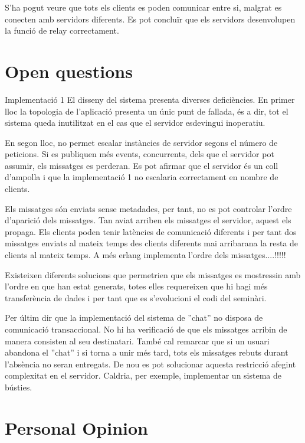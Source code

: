 \documentclass[a4paper, 11pt]{article}
\begin{document}
S'ha pogut veure que tots els clients es poden comunicar entre si, malgrat es conecten amb servidors diferents.
Es pot concluïr que els servidors desenvolupen la funció de relay correctament. 

\section{Open questions}


Implementació 1
El disseny del sistema presenta diverses deficiències. En primer lloc la topologia de l'aplicació presenta un únic punt de fallada, és a dir, tot el sistema queda inutilitzat en el cas que el servidor esdevingui inoperatiu. 

En segon lloc, no permet escalar instàncies de servidor segons el número de peticions. Si es publiquen més events, concurrents, dels que el servidor pot assumir, els missatges es perderan.
Es pot afirmar que el servidor és un coll d'ampolla i que la implementació 1 no escalaria correctament en nombre de clients. 

Els missatges són enviats sense metadades, per tant, no es pot controlar l'ordre d'aparició dels missatges. Tan aviat arriben els missatges el servidor, aquest els propaga. Els clients poden tenir latències de comunicació diferents i per tant dos missatges enviats al mateix temps des clients diferents mai arribarana la resta de clients al mateix temps. A més erlang implementa l'ordre dels missatges....!!!!!

Existeixen diferents solucions que permetrien que els missatges es mostressin amb l'ordre en que han estat generats, totes elles requereixen que hi hagi més transferència de dades i per tant que es s'evolucioni el codi del seminàri. 

Per últim dir que la implementació del sistema de ''chat'' no disposa de comunicació transaccional. No hi ha verificació de que els missatges arribin de manera consisten al seu destinatari. També cal remarcar que si un usuari abandona el ''chat'' i si torna a unir més tard, tots els missatges rebuts durant l'absència no seran entregats. 
De nou es pot solucionar aquesta restricció afegint complexitat en el servidor. Caldria, per exemple, implementar un sistema de bústies. 




\section{Personal Opinion}

\end{document}
